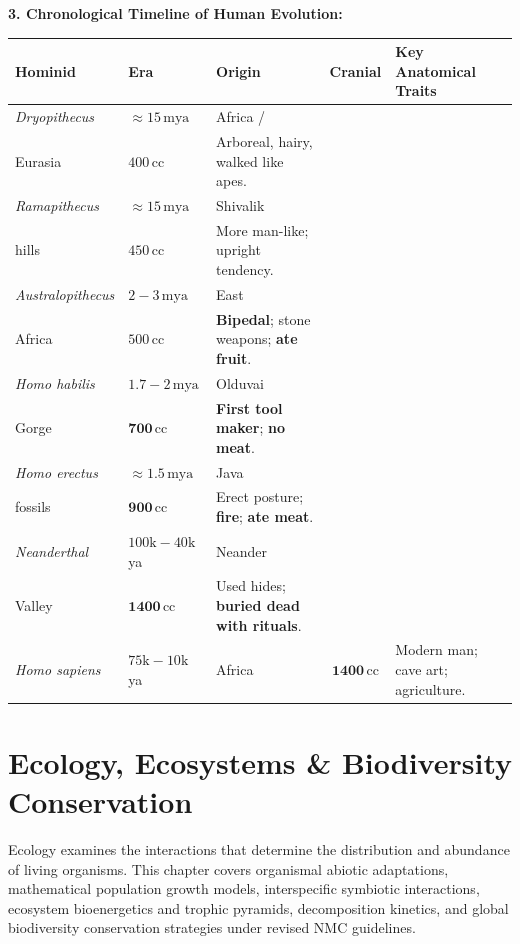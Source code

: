 \documentclass[10pt,twoside,openright]{book}
\begin{document}
\begin{conceptbox}
\textbf{3. Chronological Timeline of Human Evolution:}\par
\vspace{4pt}
\scriptsize
\setlength{\tabcolsep}{1.2pt}
\renewcommand{\arraystretch}{1.15}
\begin{tabularx}{\linewidth}{>{\RaggedRight}p{2.0cm} >{\RaggedRight}p{1.1cm} >{\RaggedRight}p{1.3cm} c >{\RaggedRight}X}
\toprule
\textbf{Hominid} & \textbf{Era} & \textbf{Origin} & \textbf{Cranial} & \textbf{Key Anatomical Traits} \\
\midrule
\textit{Dryopithecus} & $\approx 15\,\mathrm{mya}$ & Africa /\\Eurasia & $400\,\mathrm{cc}$ & Arboreal, hairy, walked like apes. \\
\textit{Ramapithecus} & $\approx 15\,\mathrm{mya}$ & Shivalik\\hills & $450\,\mathrm{cc}$ & More man-like; upright tendency. \\
\textit{Aus\-tralo\-pi\-the\-cus} & $2-3\,\mathrm{mya}$ & East\\Africa & $500\,\mathrm{cc}$ & \textbf{Bipedal}; stone weapons; \textbf{ate fruit}. \\
\textit{Homo habilis} & $1.7-2\,\mathrm{mya}$ & Olduvai\\Gorge & $\mathbf{700\,\mathrm{cc}}$ & \textbf{First tool maker}; \textbf{no meat}. \\
\textit{Homo erectus} & $\approx 1.5\,\mathrm{mya}$ & Java\\fossils & $\mathbf{900\,\mathrm{cc}}$ & Erect posture; \textbf{fire}; \textbf{ate meat}. \\
\textit{Neanderthal} & $100\text{k}-40\text{k}$ ya & Neander\\Valley & $\mathbf{1400\,\mathrm{cc}}$ & Used hides; \textbf{buried dead with rituals}. \\
\textit{Homo sapiens} & $75\text{k}-10\text{k}$ ya & Africa & $\mathbf{1400\,\mathrm{cc}}$ & Modern man; cave art; agriculture. \\
\bottomrule
\end{tabularx}
\end{conceptbox}

\chapter{Ecology, Ecosystems \& Biodiversity Conservation}

Ecology examines the interactions that determine the distribution and abundance of living organisms. This chapter covers organismal abiotic adaptations, mathematical population growth models, interspecific symbiotic interactions, ecosystem bioenergetics and trophic pyramids, decomposition kinetics, and global biodiversity conservation strategies under revised NMC guidelines.
\end{document}
